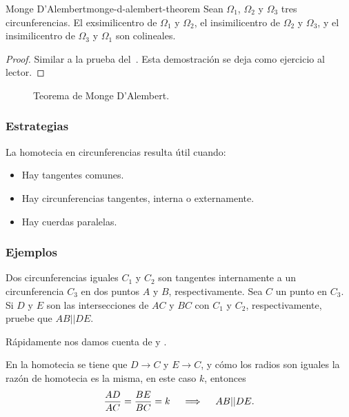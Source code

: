 \begin{section-theorem.tcb}{Monge D'Alembert}{monge-d-alembert-theorem}
    Sean $\Omega_1$, $\Omega_2$ y $\Omega_3$ tres circunferencias.
    El exsimilicentro de $\Omega_1$ y $\Omega_2$, el insimilicentro de $\Omega_2$ y $\Omega_3$, y el insimilicentro de $\Omega_3$ y $\Omega_1$ son colineales.
\end{section-theorem.tcb}
\begin{proof}
    Similar a la prueba del~.
    Esta demostración se deja como ejercicio al lector.
\end{proof}

\begin{figure}[H]
    \centering
    
    \caption{Teorema de Monge D'Alembert.}
\end{figure}



\subsubsection{Estrategias}
La homotecia en circunferencias resulta útil cuando:
\begin{itemize}
    \item Hay tangentes comunes.
    \item Hay circunferencias tangentes, interna o externamente.
    \item Hay cuerdas paralelas.
\end{itemize}

\subsubsection{Ejemplos}

\begin{section-example.tcb}{}{}
    Dos circunferencias iguales $C_1$ y $C_2$ son tangentes internamente a un circunferencia $C_3$ en dos puntos $A$ y $B$, respectivamente.
    Sea $C$ un punto en $C_3$.
    Si $D$ y $E$ son las intersecciones de $AC$ y $BC$ con $C_1$ y $C_2$, respectivamente, pruebe que $AB || DE$.
\end{section-example.tcb}
\begin{solution}
    Rápidamente nos damos cuenta de  y .
    \begin{multicols}{2}
        \begin{figure}[H]
            \centering
            
        \end{figure}
        En la homotecia se tiene que $D \to C$ y $E \to C$, y cómo los radios son iguales la razón de homotecia es la misma, en este caso $k$, entonces
        \[
            \dfrac{AD}{AC} = \dfrac{BE}{BC} = k \quad \implies \quad AB || DE. \qedhere
        \]
    \end{multicols}
\end{solution}


